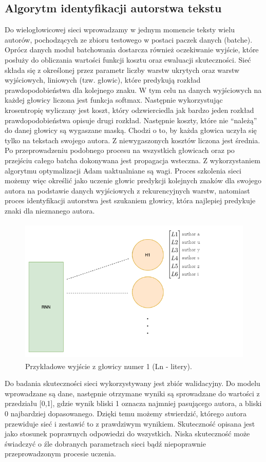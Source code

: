 \subsection{Algorytm identyfikacji autorstwa tekstu}

Do wielogłowicowej sieci wprowadzamy w jednym momencie teksty wielu autorów, pochodzących ze zbioru 
testowego w postaci paczek danych (batche). Oprócz danych moduł batchowania dostarcza również 
oczekiwanie wyjście, które posłuży do obliczania wartości funkcji kosztu oraz ewaluacji skuteczności. 
Sieć składa się z określonej przez parametr liczby warstw ukrytych oraz warstw wyjściowych, 
liniowych (tzw. głowic), które predykują rozkład prawdopodobieństwa dla kolejnego znaku. 
W tym celu na danych wyjściowych na każdej głowicy liczona jest funkcja softmax. 
Następnie wykorzystując
krosentropię wyliczany jest koszt, który odzwierciedla jak bardzo jeden rozkład 
prawdopodobieństwa opisuje drugi rozkład. Następnie koszty, które nie ``należą'' do danej głowicy są wygaszane maską. Chodzi o to, by 
każda głowica uczyła się tylko na tekstach swojego autora. Z niewygaszonych kosztów liczona jest średnia.
Po przeprowadzeniu podobnego procesu na wszystkich głowicach oraz po przejściu całego batcha
 dokonywana jest propagacja wsteczna. 
Z wykorzystaniem algorytmu optymalizacji Adam uaktualniane są wagi. Proces szkolenia sieci
możemy więc określić jako uczenie głowic predykcji kolejnych znaków dla swojego autora na podstawie
danych wyjściowych z rekurencyjnych warstw, natomiast proces identyfikacji autorstwa jest szukaniem głowicy, 
która najlepiej predykuje znaki dla nieznanego autora.

\begin{figure}[H]
\centering
\includegraphics[height=7cm]{./images/rnn-output-2.png}
\caption{Przykładowe wyjście z głowicy numer 1 (Ln - litery).}
\label{fig:test5}
\end{figure} 

Do badania skuteczności sieci wykorzystywany jest zbiór walidacyjny. Do modelu wprowadzane są dane, 
następnie otrzymane wyniki są sprowadzane do wartości z przedziału [0,1], 
gdzie wynik bliski 1 oznacza najmniej pasującego autora, a bliski 0 najbardziej dopasowanego.
Dzięki temu możemy stwierdzić, którego autora przewiduje sieć i zestawić to z prawdziwym wynikiem.
Skuteczność opisana jest jako stosunek poprawnych odpowiedzi do wszystkich. Niska skuteczność może 
świadczyć o źle dobranych parametrach sieci bądź niepoprawnie przeprowadzonym procesie uczenia.